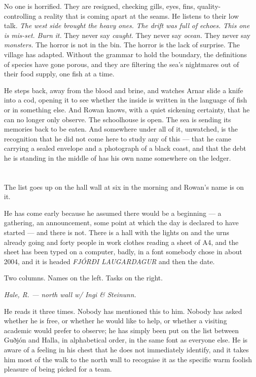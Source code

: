\documentclass[11pt,oneside]{book}
\begin{document}
No one is horrified. They are resigned, checking gills, eyes, fins,
quality-controlling a reality that is coming apart at the seams. He
listens to their low talk. \emph{The west side brought the heavy ones.
The drift was full of echoes. This one is mis-set. Burn it.} They never
say \emph{caught.} They never say \emph{ocean.} They never say
\emph{monsters.} The horror is not in the bin. The horror is the lack of
surprise. The village has adapted. Without the grammar to hold the
boundary, the definitions of species have gone porous, and they are
filtering the sea's nightmares out of their food supply, one fish at a
time.

He steps back, away from the blood and brine, and watches Arnar slide a
knife into a cod, opening it to see whether the inside is written in the
language of fish or in something else. And Rowan knows, with a quiet
sickening certainty, that he can no longer only observe. The schoolhouse
is open. The sea is sending its memories back to be eaten. And somewhere
under all of it, unwatched, is the recognition that he did not come here
to study any of this --- that he came carrying a sealed envelope and a
photograph of a black coast, and that the debt he is standing in the
middle of has his own name somewhere on the ledger.

\chapter{}

The list goes up on the hall wall at six in the morning and Rowan's name
is on it.

He has come early because he assumed there would be a beginning --- a
gathering, an announcement, some point at which the day is declared to
have started --- and there is not. There is a hall with the lights on
and the urns already going and forty people in work clothes reading a
sheet of A4, and the sheet has been typed on a computer, badly, in a
font somebody chose in about 2004, and it is headed \emph{FJÓRÐI
LAUGARDAGUR} and then the date.

Two columns. Names on the left. Tasks on the right.

\emph{Hale, R. --- north wall w/ Ingi \& Steinunn.}

He reads it three times. Nobody has mentioned this to him. Nobody has
asked whether he is free, or whether he would like to help, or whether
a visiting academic would prefer to observe; he has simply been put on
the list between Guðjón and Halla, in alphabetical order, in the same
font as everyone else. He is aware of a feeling in his chest that he
does not immediately identify, and it takes him most of the walk to the
north wall to recognise it as the specific warm foolish pleasure of
being picked for a team.
\end{document}
